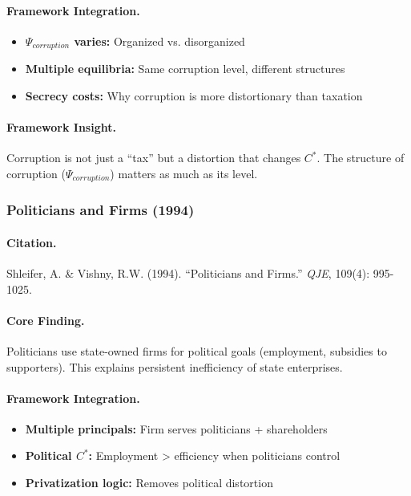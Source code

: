 \documentclass[12pt,a4paper]{article}
\begin{document}
\paragraph{Framework Integration.}
\begin{itemize}
  \item \textbf{$\Psi_{corruption}$ varies:} Organized vs. disorganized
  \item \textbf{Multiple equilibria:} Same corruption level, different structures
  \item \textbf{Secrecy costs:} Why corruption is more distortionary than taxation
\end{itemize}

\paragraph{Framework Insight.}
Corruption is not just a ``tax'' but a distortion that changes $C^*$.
The structure of corruption ($\Psi_{corruption}$) matters as much as its level.

\subsubsection{Politicians and Firms (1994)}

\paragraph{Citation.}
Shleifer, A. \& Vishny, R.W. (1994).
``Politicians and Firms.'' \emph{QJE}, 109(4): 995-1025.

\paragraph{Core Finding.}
Politicians use state-owned firms for political goals (employment, subsidies
to supporters). This explains persistent inefficiency of state enterprises.

\paragraph{Framework Integration.}
\begin{itemize}
  \item \textbf{Multiple principals:} Firm serves politicians + shareholders
  \item \textbf{Political $C^*$:} Employment > efficiency when politicians control
  \item \textbf{Privatization logic:} Removes political distortion
\end{itemize}
\end{document}
